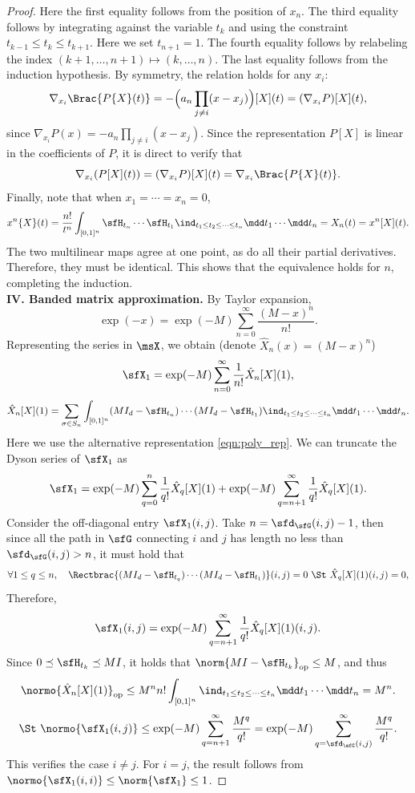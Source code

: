 \documentclass[11pt]{article}
\begin{document}
\begin{proof}
\noindent
Here the first equality follows from the position of $x_n$. The third equality follows by integrating against the variable $t_k$ and using the constraint $t_{k-1} \le t_k \le t_{k+1}$. Here we set $t_{n+1}=1$. The fourth equality follows by relabeling the index $(k+1,\dots,n+1) \mapsto (k,\dots,n)$. The last equality follows from the induction hypothesis. By symmetry, the relation holds for any $x_i$:
\[
    \nabla_{x_i} \Brac{ P\{X\}(t) } = - \Big( a_n \prod_{j\neq i} (x-x_j) \Big) [X](t) = (\nabla_{x_i} P) [X] (t), 
\]
since $\nabla_{x_i} P(x) = - a_n \prod_{j \neq i} (x-x_j)$. Since the representation $P[X]$ is linear in the coefficients of $P$, it is direct to verify that
\[
    \nabla_{x_i} ( P[X] (t) ) = (\nabla_{x_i} P) [X] (t) = \nabla_{x_i} \Brac{ P\{X\}(t) }.
\]
Finally, note that when $x_1 = \cdots = x_n = 0$,
\[
    x^n\{X\}(t) = \frac{n!}{t^n} \int_{[0,1]^n} \sfH_{t_n} \cdots \sfH_{t_1} \ind_{t_1\le t_2 \le \cdots \le t_n} \mdd t_1 \cdots \mdd t_n = X_n(t) = x^n[X](t).
\]
The two multilinear maps agree at one point, as do all their partial derivatives. Therefore, they must be identical. This shows that the equivalence holds for $n$, completing the induction.
%
\ \\[5pt]
%
{\bf IV. Banded matrix approximation.}
By Taylor expansion, 
\[
    \exp(-x) = \exp(-M) \sum_{n=0}^\infty \frac{ (M-x)^n }{n!}.
\]
Representing the series in $\msX$, we obtain (denote $\hat{X}_n(x) = (M-x)^n$)
\[
    \sfX_1 = \exp(-M) \sum_{n=0}^\infty  \frac{1}{n!} \hat{X}_n [X] (1),
\]
\[
    \hat{X}_n[X](1) = \sum_{\sigma \in S_n} \int_{[0,1]^n} (MI_d-\sfH_{t_n}) \cdots (MI_d-\sfH_{t_1}) \ind_{t_1\le t_2 \le \cdots \le t_n} \mdd t_1 \cdots \mdd t_n.
\]
Here we use the alternative representation \eqref{eqn:poly_rep}. We can truncate the Dyson series of $\sfX_1$ as
\[
    \sfX_1 = \exp(-M) \sum_{q=0}^{n}  \frac{1}{q!} \hat{X}_q [X] (1) + \exp(-M) \sum_{q=n+1}^\infty \frac{1}{q!} \hat{X}_q [X] (1).
\]
Consider the off-diagonal entry $\sfX_1(i,j)$. Take $n = \sfd_\sfG(i,j) - 1 $, then since all the path in $\sfG$ connecting $i$ and $j$ has length no less than $\sfd_\sfG(i,j)>n$, it must hold that
\[
    \forall 1\le q \le n, \quad \Rectbrac{  (MI_d-\sfH_{t_q}) \cdots (MI_d-\sfH_{t_1}) } (i,j) = 0 ~\St~ \hat{X}_q[X](1)(i,j) = 0,
\]
Therefore, 
\[
    \sfX_1(i,j) = \exp(-M) \sum_{q=n+1}^\infty \frac{1}{q!} \hat{X}_q [X] (1)(i,j).
\]
Since $0 \preceq \sfH_{t_k} \preceq M I$, it holds that $\norm{MI - \sfH_{t_k}}_{\rm op} \le M$, and thus
\[
    \normo{ \hat{X}_n[X](1) }_{\rm op} \le M^n n! \int_{[0,1]^n} \ind_{t_1\le t_2 \le \cdots \le t_n} \mdd t_1 \cdots \mdd t_n = M^n. 
\]
\[
    \St~ \normo{\sfX_1(i,j)} \le \exp(-M) \sum_{q=n+1}^\infty \frac{M^q}{q!} = \exp(-M) \sum_{q=\sfd_\sfG(i,j)}^\infty \frac{M^q}{q!}.
\]
This verifies the case $i\neq j$. For $i=j$, the result follows from $\normo{\sfX_1(i,i)} \le \norm{\sfX_1}\le 1$.
\end{proof}
\end{document}
